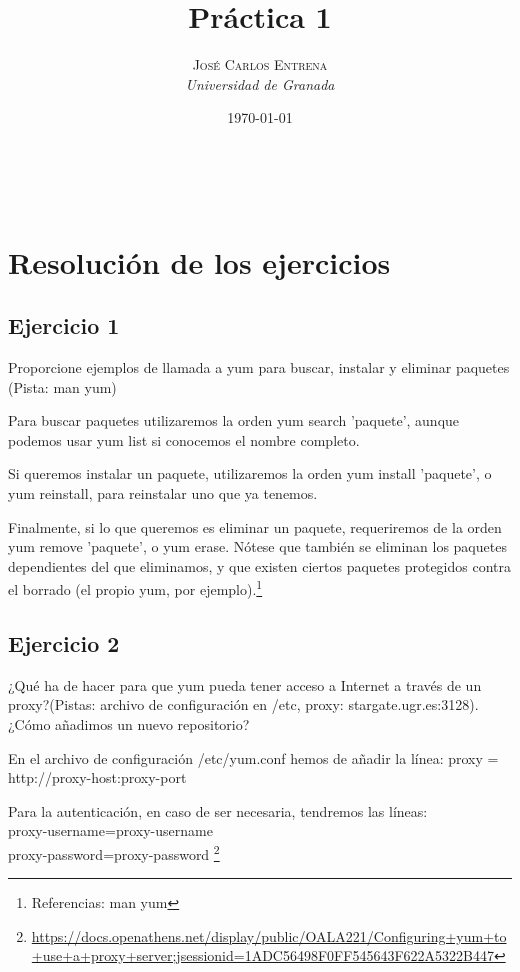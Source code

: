 \documentclass[a4paper, 11pt]{article} %
\title{\textbf{Práctica 1}\\ %
} %
\author{\textsc{José Carlos Entrena} %
\\{\textit{Universidad de Granada}}} %
\date{\today} %
\makeatletter
\renewcommand{\maketitle}{ %
\begin{flushright} %
{\LARGE\@title} %

\vspace{60pt} %

{\large\@author} %
\\\@date %

\vspace{40pt} %
\end{flushright}
}
\makeatother
\begin{document}
\maketitle %

{\parskip=2pt
  \tableofcontents
}   %

\pagebreak %

\section{Resolución de los ejercicios}


\subsection{Ejercicio 1}
Proporcione ejemplos de llamada a yum para buscar, instalar y eliminar
paquetes (Pista: man yum)

Para buscar paquetes utilizaremos la orden yum search 'paquete', aunque podemos usar yum list si conocemos el nombre completo.

Si queremos instalar un paquete, utilizaremos la orden yum install 'paquete', o yum reinstall, para reinstalar uno que ya tenemos. 

Finalmente, si lo que queremos es eliminar un paquete, requeriremos de la orden  yum remove 'paquete', o yum erase. Nótese que también se eliminan los paquetes dependientes del que eliminamos, y que existen ciertos paquetes protegidos contra el borrado (el propio yum, por ejemplo).\footnote{Referencias: man yum}

\subsection{Ejercicio 2}
¿Qué ha de hacer para que yum pueda tener acceso a Internet a través
de un proxy?(Pistas: archivo de configuración en /etc, proxy: stargate.ugr.es:3128).
¿Cómo añadimos un nuevo repositorio? 

En el archivo de configuración /etc/yum.conf hemos de añadir la línea: 
proxy = http://proxy-host:proxy-port

Para la autenticación, en caso de ser necesaria, tendremos las líneas:\\
proxy-username=proxy-username\\
proxy-password=proxy-password \footnote{\url{https://docs.openathens.net/display/public/OALA221/Configuring+yum+to+use+a+proxy+server;jsessionid=1ADC56498F0FF545643F622A5322B447}}
\end{document}
